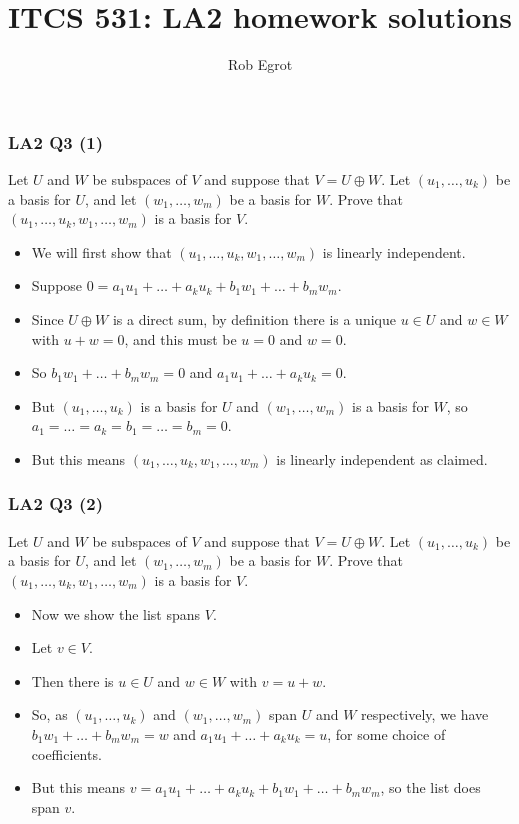 \documentclass[handout]{beamer}
\title{ITCS 531: LA2 homework solutions}
\date{}
\author{Rob Egrot}
\begin{document}
\begin{frame}
\titlepage
\end{frame}

\begin{frame}
\frametitle{LA2 Q3 (1)}
Let $U$ and $W$ be subspaces of $V$ and suppose that $V = U\oplus W$. Let $(u_1,\ldots,u_k)$ be  a basis for $U$, and let $(w_1,\ldots,w_m)$ be a basis for $W$. Prove that $(u_1,\ldots,u_k,w_1,\ldots,w_m)$ is a basis for $V$.
\vspace{0.5cm}
\begin{itemize}
\item We will first show that $(u_1,\ldots,u_k,w_1,\ldots,w_m)$ is linearly independent. 
\item Suppose $0 = a_1u_1+\ldots + a_ku_k + b_1w_1 + \ldots + b_mw_m$. 
\item Since $U\oplus W$ is a direct sum, by definition there is a unique $u\in U$ and $w\in W$ with $u+w=0$, and this must be $u = 0$ and $w= 0$. 
\item So $b_1w_1 + \ldots + b_mw_m = 0$ and $a_1u_1+\ldots + a_ku_k = 0$. 
\item But $(u_1,\ldots,u_k)$ is a basis for $U$ and $(w_1,\ldots,w_m)$ is a basis for $W$, so $a_1=\ldots = a_k=b_1=\ldots = b_m=0$. 
\item But this means $(u_1,\ldots,u_k,w_1,\ldots,w_m)$ is linearly independent as claimed.
\end{itemize}
\end{frame}

\begin{frame}
\frametitle{LA2 Q3 (2)}
Let $U$ and $W$ be subspaces of $V$ and suppose that $V = U\oplus W$. Let $(u_1,\ldots,u_k)$ be  a basis for $U$, and let $(w_1,\ldots,w_m)$ be a basis for $W$. Prove that $(u_1,\ldots,u_k,w_1,\ldots,w_m)$ is a basis for $V$.
\vspace{0.5cm}
\begin{itemize}
\item Now we show the list spans $V$. \vspace{0.2cm}
\item Let $v\in V$. \vspace{0.2cm}
\item Then there is $u\in U$ and $w\in W$ with $v = u+w$. \vspace{0.2cm}
\item So, as $(u_1,\ldots,u_k)$ and $(w_1,\ldots,w_m)$ span $U$ and $W$ respectively, we have $b_1w_1 + \ldots + b_mw_m = w$ and $a_1u_1+\ldots + a_ku_k = u$, for some choice of coefficients. \vspace{0.2cm}
\item But this means $v = a_1u_1+\ldots + a_ku_k+b_1w_1 + \ldots + b_mw_m$, so the list does span $v$. 
\end{itemize}
\end{frame}
\end{document}
